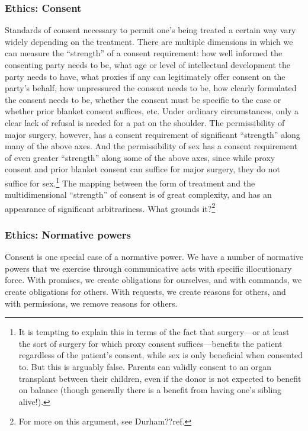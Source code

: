 \subsubsection{Ethics: Consent}
Standards of consent necessary to permit one's being treated a certain way vary widely depending on the treatment.
There are multiple dimensions in which we can measure the ``strength'' of a consent requirement: how well informed the 
consenting party needs to be, what age or level of intellectual development the party needs to have, what proxies if
any can legitimately offer consent on the party's behalf, how unpressured the consent needs to be, how clearly formulated the consent
needs to be, whether the consent must be specific to the case or whether prior blanket consent suffices, etc.
Under ordinary circumstances, only a clear lack of refusal is needed for a pat on the shoulder. The permissibility
of major surgery, however, has a consent requirement of significant ``strength'' along many of the above axes. 
And the permissibility of sex has a consent requirement of even greater ``strength'' along some of the above axes,
since while proxy consent and prior blanket consent can suffice for major surgery, they do not suffice for sex.\footnote{It is tempting
to explain this in terms of the fact that surgery---or at least the sort of surgery for which proxy consent suffices---benefits 
the patient regardless of the patient's consent, while sex is only beneficial when consented to. But this is arguably false.
Parents can validly consent to an organ transplant between their children, even if the donor is not expected to benefit
on balance (though generally there is a benefit from having one's sibling alive!).} The mapping between
the form of treatment and the multidimensional ``strength'' of consent is of great complexity, and has an appearance of significant
arbitrariness. What grounds it?\footnote{For more on this argument, see Durham??ref.}


\subsubsection{Ethics: Normative powers}
Consent is one special case of a normative power.
We have a number of normative powers that we exercise through communicative acts with specific illocutionary force.
With promises, we create obligations for ourselves, and with commands, we create obligations
for others. With requests, we create reasons for others, and with permissions, we remove reasons for others. 

